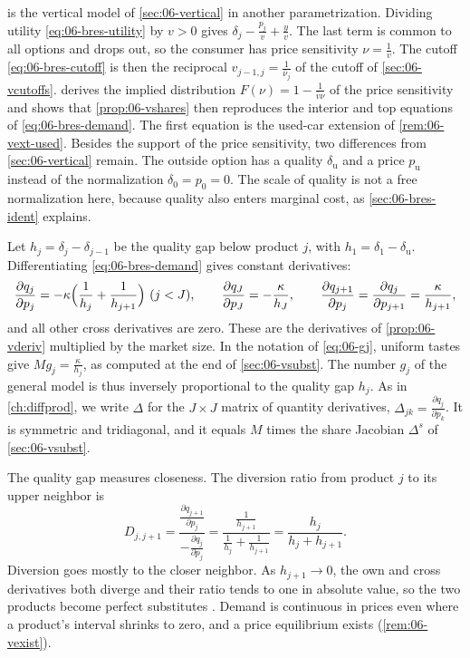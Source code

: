  is the vertical model of \cref{sec:06-vertical} in another parametrization. Dividing
utility \eqref{eq:06-bres-utility} by $v > 0$ gives $\delta_j - \frac{p_j}{v} + \frac{y}{v}$. The last term is common
to all options and drops out, so the consumer has price sensitivity $\nu = \frac{1}{v}$. The cutoff
\eqref{eq:06-bres-cutoff} is then the reciprocal $v_{j-1,j} = \frac{1}{\bar\nu_j}$ of the cutoff of \cref{sec:06-vcutoffs}.
 derives the implied distribution $F(\nu) = 1 - \frac{1}{\bar v\nu}$ of the price sensitivity and
shows that \cref{prop:06-vshares} then reproduces the interior and top equations of \eqref{eq:06-bres-demand}. The
first equation is the used-car extension of \cref{rem:06-vext-used}. Besides the support of the price
sensitivity, two differences from \cref{sec:06-vertical} remain. The outside option has a quality $\delta_{\mathrm u}$ and a price $p_{\mathrm u}$ instead of the
normalization $\delta_0 = p_0 = 0$. The scale of quality is not a free normalization here, because quality also
enters marginal cost, as \cref{sec:06-bres-ident} explains.

Let $h_j = \delta_j - \delta_{j-1}$ be the quality gap below product $j$, with $h_1 = \delta_1 - \delta_{\mathrm u}$.
Differentiating \eqref{eq:06-bres-demand} gives constant derivatives:
\begin{equation}\label{eq:06-bres-deriv}
  \frac{\partial q_j}{\partial p_j} = -\kappa\Bigl(\frac{1}{h_j} + \frac{1}{h_{j+1}}\Bigr)\ (j<J),
  \qquad
  \frac{\partial q_J}{\partial p_J} = -\frac{\kappa}{h_J},
  \qquad
  \frac{\partial q_{j+1}}{\partial p_j} = \frac{\partial q_j}{\partial p_{j+1}} = \frac{\kappa}{h_{j+1}},
\end{equation}
and all other cross derivatives are zero. These are the derivatives of \cref{prop:06-vderiv} multiplied by the
market size. In the notation of \eqref{eq:06-gj}, uniform tastes give $Mg_j = \frac{\kappa}{h_j}$, as computed at the
end of \cref{sec:06-vsubst}. The number $g_j$ of the general model is thus inversely proportional to the quality
gap $h_j$. As in \cref{ch:diffprod}, we write $\Delta$ for the $J\times J$ matrix of quantity derivatives,
$\Delta_{jk} = \frac{\partial q_j}{\partial p_k}$. It is symmetric and tridiagonal, and it equals $M$ times the share
Jacobian $\Delta^s$ of \cref{sec:06-vsubst}.

The quality gap measures closeness. The diversion ratio from product $j$ to its upper neighbor is
\begin{equation*}
  D_{j,j+1} = \frac{\frac{\partial q_{j+1}}{\partial p_j}}{-\frac{\partial q_j}{\partial p_j}}
  = \frac{\frac{1}{h_{j+1}}}{\frac{1}{h_j} + \frac{1}{h_{j+1}}}
  = \frac{h_j}{h_j + h_{j+1}} .
\end{equation*}
Diversion goes mostly to the closer neighbor. As $h_{j+1} \to 0$, the own and cross derivatives both diverge and
their ratio tends to one in absolute value, so the two products become perfect substitutes
\citep[p.~462]{Bresnahan1987}. Demand is continuous in prices even where a product's interval shrinks to zero, and
a price equilibrium exists (\cref{rem:06-vexist}).

